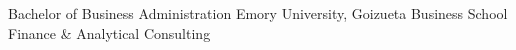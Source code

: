 

\begin{cventries}

  \cventry
    {Bachelor of Business Administration} %
    {Emory University, Goizueta Business School} %
    {} %
    {} %
    {Finance \& Analytical Consulting}
\end{cventries}
